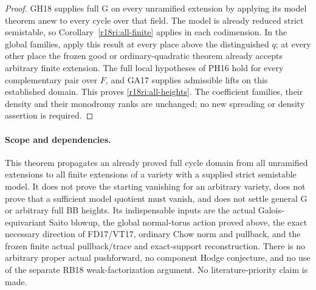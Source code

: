 \begin{proof}
GH18 supplies full G on every unramified extension by applying its
model theorem anew to every cycle over that field.  The model is
already reduced strict semistable, so
Corollary~\ref{r18ri:all-finite} applies in each codimension.
In the global families, apply this result at every place above the
distinguished $q$; at every other place the frozen good or
ordinary-quadratic theorem already accepts arbitrary finite
extension.  The full local hypotheses of PH16 hold for every
complementary pair over $F$, and GA17 supplies admissible lifts on
this established domain.  This proves \eqref{r18ri:all-heights}.
The coefficient families, their density and their monodromy ranks
are unchanged; no new spreading or density assertion is required.
\end{proof}

\paragraph{Scope and dependencies.}
This theorem propagates an already proved full cycle domain from all
unramified extensions to all finite extensions of a variety with a
supplied strict semistable model.  It does not prove the starting
vanishing for an arbitrary variety, does not prove that a sufficient
model quotient must vanish, and does not settle general G or arbitrary
full BB heights.  Its indispensable inputs are the actual
Galois-equivariant Saito blowup, the global normal-torus action proved
above, the exact necessary direction of FD17/VT17, ordinary Chow norm
and pullback, and the frozen finite actual pullback/trace and
exact-support reconstruction.  There is no arbitrary proper actual
pushforward, no component Hodge conjecture, and no use of the separate
RB18 weak-factorization argument.  No literature-priority claim is made.
